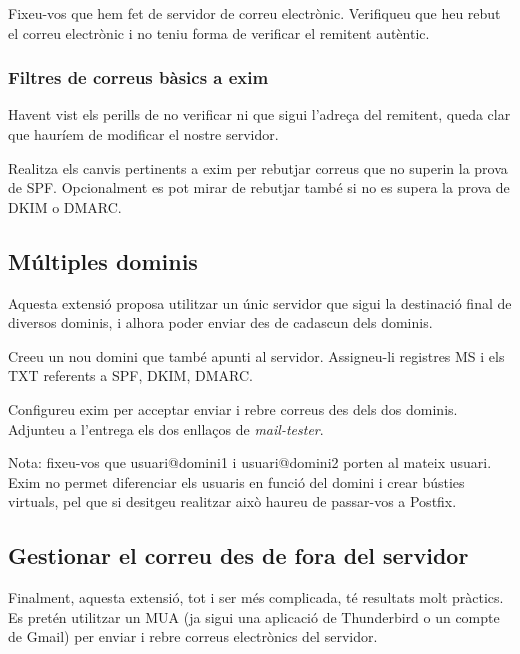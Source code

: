 \documentclass{practicaitic}
\begin{document}
Fixeu-vos que hem fet de servidor de correu electrònic. Verifiqueu que heu rebut
el correu electrònic i no teniu forma de verificar el remitent autèntic.

\subsubsection{Filtres de correus bàsics a exim}

Havent vist els perills de no verificar ni que sigui l'adreça del remitent,
queda clar que hauríem de modificar el nostre servidor.

\begin{tasca}
Realitza els canvis pertinents a exim per rebutjar correus que no superin
la prova de SPF. Opcionalment es pot mirar de rebutjar també si no es supera
la prova de DKIM o DMARC.
\end{tasca}

\subsection{Múltiples dominis}

Aquesta extensió proposa utilitzar un únic servidor que sigui la destinació
final de diversos dominis, i alhora poder enviar des de cadascun dels dominis.

\begin{previ}
  Creeu un nou domini que també apunti al servidor. Assigneu-li registres
  MS i els TXT referents a SPF, DKIM, DMARC.
\end{previ}

\begin{tasca}
  Configureu exim per acceptar enviar i rebre correus des dels dos dominis.
  Adjunteu a l'entrega els dos enllaços de \textit{mail-tester}.

  Nota: fixeu-vos que usuari@domini1 i usuari@domini2 porten al mateix usuari.
  Exim no permet diferenciar els usuaris en funció del domini i crear bústies
  virtuals, pel que si desitgeu realitzar això haureu de passar-vos a Postfix.
\end{tasca}

\subsection{Gestionar el correu des de fora del servidor}

Finalment, aquesta extensió, tot i ser més complicada, té resultats molt pràctics.
Es pretén utilitzar un MUA (ja sigui una aplicació de
Thunderbird o un compte de Gmail) per enviar i rebre correus electrònics
del servidor.
\end{document}
